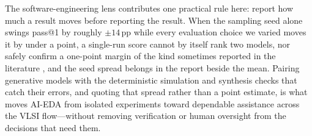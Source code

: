 \documentclass[conference]{IEEEtran}
\begin{document}
\noindent The software-engineering lens contributes one practical rule here: report how much a result moves before reporting the result. When the sampling seed alone swings pass@1 by roughly $\pm 14$\,pp while every evaluation choice we varied moves it by under a point, a single-run score cannot by itself rank two models, nor safely confirm a one-point margin of the kind sometimes reported in the literature \cite{P11_Thakur2024}, and the seed spread belongs in the report beside the mean. Pairing generative models with the deterministic simulation and synthesis checks that catch their errors, and quoting that spread rather than a point estimate, is what moves AI-EDA from isolated experiments toward dependable assistance across the VLSI flow---without removing verification or human oversight from the decisions that need them.



\end{document}
